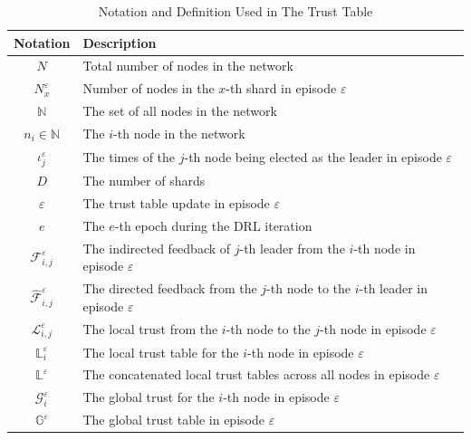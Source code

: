 \begin{table}[t]
    \centering
    \caption{Notation and Definition Used in The Trust Table}
    \label{table1}
    \renewcommand\arraystretch{1.2}
    \begin{tabular}{c|p{6cm}}
        \hline
        \textbf{Notation}               & \textbf{Description}  
\\         \hline
$N$     &Total number of nodes in the network
\\
$N_x^\varepsilon$       &Number of nodes in the $x$-th shard in episode $\varepsilon$
\\
$\mathbb{N}$        &The set of all nodes in the network
\\
$n_i \in \mathbb{N}$        &The $i$-th node in the network 
\\
$\iota_j^\varepsilon$       &The times of the $j$-th node
being elected as the leader in episode $\varepsilon$
\\
$D$     & The number of shards 
\\
$\varepsilon$       &The trust table update in episode $\varepsilon$
\\
$e$     &The $e$-th epoch during the DRL iteration
\\

$\mathcal{F}_{i,j}^\varepsilon$     &The indirected feedback of $j$-th leader from the $i$-th node in episode $\varepsilon$
\\

$\hat{\mathcal{F}}_{i,j}^\varepsilon$     &The directed feedback from the $j$-th node to the $i$-th leader in episode $\varepsilon$
\\

$\mathcal{L}_{i,j}^\varepsilon$      &The local trust from the $i$-th node to the $j$-th node in episode $\varepsilon$
\\

$\mathbb{L}_{i}^\varepsilon$     &The local trust table for the $i$-th node in episode $\varepsilon$
\\

$\mathbb{L}^\varepsilon$    &The concatenated local trust tables across all nodes in episode $\varepsilon$
\\

$\mathcal{G}_{i}^\varepsilon$   &The global trust for the $i$-th node in episode $\varepsilon$
\\

$\mathbb{G}^\varepsilon$         &The global trust table in episode $\varepsilon$
\\


\end{tabular}
\end{table}
